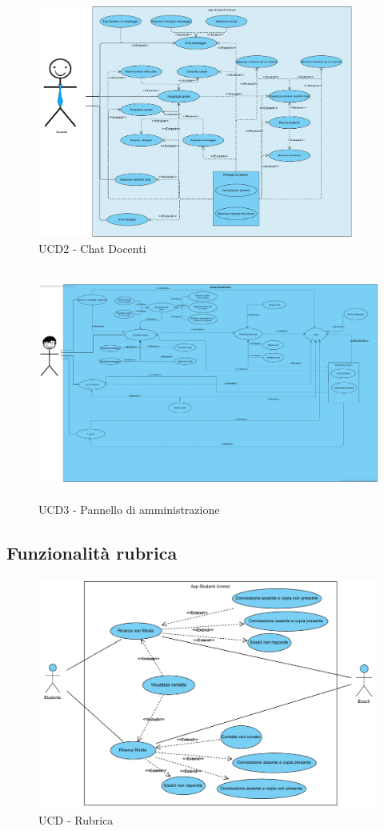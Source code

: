 \begin{figure}
	\centering
	\includegraphics[height=3in]{imgs/gruppo6/use_case_diagrams/ucd2_chat_docenti.pdf}
	\caption{UCD2 - Chat Docenti}
	\label{fig:ucd2-doc}
\end{figure}

\begin{figure}
	\centering
	\includegraphics[height=3in]{imgs/gruppo6/use_case_diagrams/ucd3_pannello.pdf}
	\caption{UCD3 - Pannello di amministrazione}
	\label{fig:ucd3-amm}
\end{figure}

\clearpage

\subsection{Funzionalità rubrica}
\begin{figure}[H]
	\centering
	\includegraphics[height=3in]{imgs/gruppo5/Diagram1.pdf}
	\caption{UCD - Rubrica}
	\label{fig:ucd-rubrica}
\end{figure}


